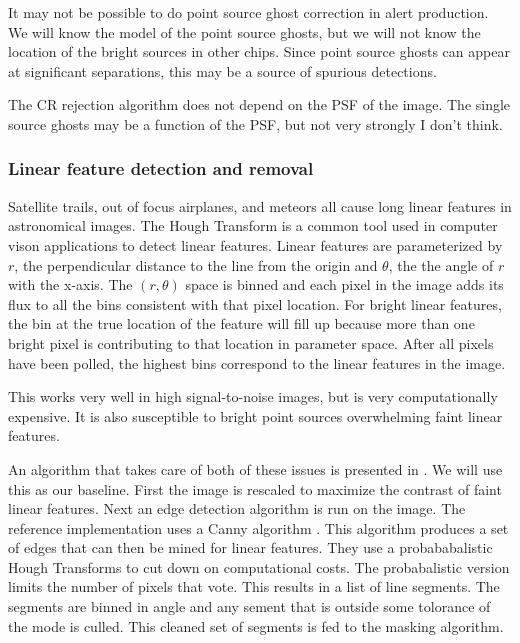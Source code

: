 \begin{note}
It may not be possible to do point source ghost correction in alert production.  We will know the model of the
point source ghosts, but we will not know the location of the bright sources in other chips.  Since point
source ghosts can appear at significant separations, this may be a source of spurious detections.
\end{note}

\begin{note}
The CR rejection algorithm does not depend on the PSF of the image.  The single source ghosts may be a function of the PSF, but not very strongly I don't think.
\end{note}

\subsubsection{Linear feature detection and removal}

Satellite trails, out of focus airplanes, and meteors all cause long linear features in astronomical images.  The Hough Transform \citep{citation_needed} is a common tool used in computer vison applications to detect linear features.  Linear features are parameterized by $r$, the perpendicular distance to the line from the origin and $\theta$, the the angle of $r$ with the x-axis.  The $(r, \theta)$ space is binned and each pixel in the image adds its flux to all the bins consistent with that pixel location.  For bright linear features, the bin at the true location of the feature will fill up because more than one bright pixel is contributing to that location in parameter space.  After all pixels have been polled, the highest bins correspond to the linear features in the image.

This works very well in high signal-to-noise images, but is very computationally expensive.  It is also susceptible to bright point sources overwhelming faint linear features.  

An algorithm that takes care of both of these issues is presented in \cite{borncamp_lim16}.  We will use this
as our baseline.  First the image is rescaled to maximize the contrast of faint linear features.  Next an edge detection algorithm is run on the image.  The reference implementation uses a Canny algorithm \citep{canny86}.  This algorithm produces a set of edges that can then be mined for linear features.  They use a probababalistic Hough Transforms \citep{galamhos99} to cut down on computational costs.  The probabalistic version limits the number of pixels that vote.  This results in a list of line segments.  The segments are binned in angle and any sement that is outside some tolorance of the mode is culled.  This cleaned set of segments is fed to the masking algorithm.

